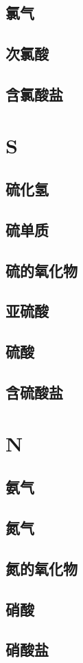 \documentclass[a4paper]{article}
\begin{document}
	\subsection{氯气}
	\subsection{次氯酸}
	\subsection{含氯酸盐}
	
	
	\newpage
	\section{S}
	\subsection{硫化氢}
	\subsection{硫单质}
	\subsection{硫的氧化物}
	\subsection{亚硫酸}
	\subsection{硫酸}
	\subsection{含硫酸盐}
	
	
	\newpage
	\section{N}
	\subsection{氨气}
	\subsection{氮气}
	\subsection{氮的氧化物}
	\subsection{硝酸}
	\subsection{硝酸盐}
	
	
\end{document}
